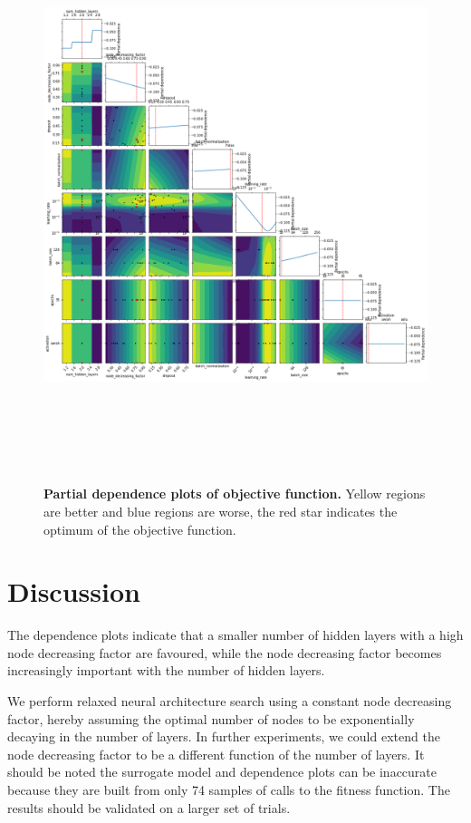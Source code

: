 \documentclass[bsc,frontabs,twoside,singlespacing,parskip,deptreport]{infthesis}     %
\let\Oldsection\section
\renewcommand{\section}{\FloatBarrier\Oldsection}
\begin{document}
\begin{figure}[h!]
\centering
\caption{\textbf{Partial dependence plots of objective function.} Yellow regions are better and blue regions are worse, the red star indicates the optimum of the objective function.}
\includegraphics[height=16cm]{images/bo_objective.png}\label{bo_obj}
\end{figure}
\section{Discussion}
The dependence plots indicate that a smaller number of hidden layers with a high node decreasing factor are favoured, while the node decreasing factor becomes increasingly important with the number of hidden layers.


We perform relaxed neural architecture search using a constant node decreasing factor, hereby assuming the optimal number of nodes to be exponentially decaying in the number of layers. In further experiments, we could extend the node decreasing factor to be a different function of the number of layers.
It should be noted the surrogate model and dependence plots can be inaccurate because they are built from only 74 samples of calls to the fitness function. The results should be validated on a larger set of trials.
\end{document}
